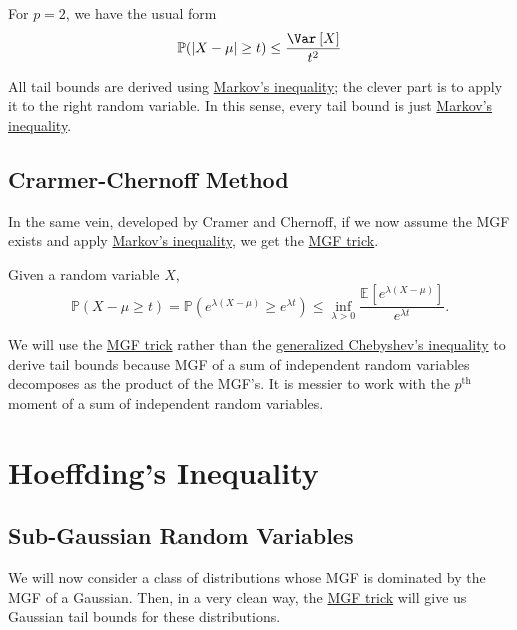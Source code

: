 \begin{remark}
	For \(p = 2\), we have the usual form
	\[
		\mathbb{P} (\vert X - \mu  \vert \geq t) \leq \frac{\Var_{}\left[X \right] }{t^2}
	\]
\end{remark}

\begin{remark}
	All tail bounds are derived using \hyperref[lma:Markov-inequality]{Markov's inequality}; the clever part is to apply it to the right random variable. In this sense, every tail bound is just \hyperref[lma:Markov-inequality]{Markov's inequality}.
\end{remark}

\subsection{Crarmer-Chernoff Method}
In the same vein, developed by Cramer and Chernoff, if we now assume the MGF exists and apply \hyperref[lma:Markov-inequality]{Markov's inequality}, we get the \hyperref[lma:MGF-trick]{MGF trick}.

\begin{lemma}\label{lma:MGF-trick}
	Given a random variable \(X\),
	\[
		\mathbb{P} (X - \mu \geq t) = \mathbb{P} (e^{\lambda (X - \mu ) } \geq e^{\lambda t}) \leq \inf _{\lambda > 0} \frac{\mathbb{E}_{}\left[e^{\lambda (X - \mu )} \right] }{e^{\lambda t}}.
	\]
\end{lemma}

We will use the \hyperref[lma:MGF-trick]{MGF trick} rather than the \hyperref[lma:Chebyshev-inequality]{generalized Chebyshev's inequality} to derive tail bounds because MGF of a sum of independent random variables decomposes as the product of the MGF's. It is messier to work with the \(p^{\text{th} } \) moment of a sum of independent random variables.

\section{Hoeffding's Inequality}
\subsection{Sub-Gaussian Random Variables}
We will now consider a class of distributions whose MGF is dominated by the MGF of a Gaussian. Then, in a very clean way, the \hyperref[lma:MGF-trick]{MGF trick} will give us Gaussian tail bounds for these distributions.

